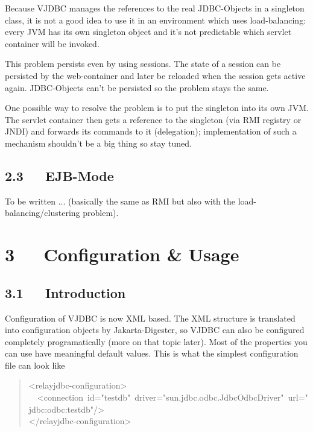 \documentclass[10pt,a4paper,english]{article}
\begin{document}
Because VJDBC manages the references to the real JDBC-Objects in a singleton class, it is not a good idea to use it in an environment which uses load-balancing: every JVM has its own singleton object and it's not predictable which servlet container will be invoked.

This problem persists even by using sessions. The state of a session can be persisted by the web-container and later be reloaded when the session gets active again. JDBC-Objects can't be persisted so the problem stays the same.

One possible way to resolve the problem is to put the singleton into its own JVM. The servlet container then gets a reference to the singleton (via RMI registry or JNDI) and forwards its commands to it (delegation); implementation of such a mechanism shouldn't be a big thing so stay tuned.



\hypertarget{ejb-mode}{}
\subsection*{2.3~~~EJB-Mode}

To be written ... (basically the same as RMI but also with the load-balancing/clustering problem).



\hypertarget{configuration-usage}{}
\section*{3~~~Configuration {\&} Usage}



\hypertarget{id1}{}
\subsection*{3.1~~~Introduction}

Configuration of VJDBC is now XML based. The XML structure is translated into configuration objects by Jakarta-Digester, so VJDBC can also be configured completely programatically (more on that topic later). Most of the properties you can use have meaningful default values. This is what the simplest configuration file can look like
\begin{quote}{\ttfamily \raggedright \noindent
<relayjdbc-configuration>~\\
~~<connection~id="testdb"~driver="sun.jdbc.odbc.JdbcOdbcDriver"~url="jdbc:odbc:testdb"/>~\\
</relayjdbc-configuration>
}\end{quote}
\end{document}
